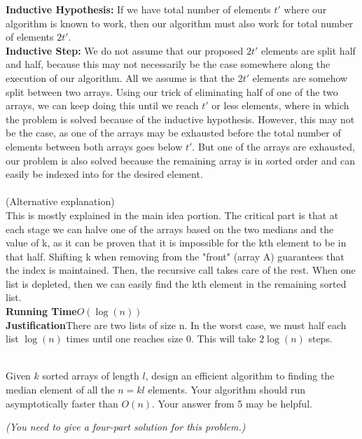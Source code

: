 \begin{qunlist}
{\textbf{Inductive Hypothesis:} If we have total number of elements $t'$ where our algorithm is known to work, then our algorithm must also work for total number of elements $2t'$.
\\
\textbf{Inductive Step:} We do not assume that our proposed $2t'$ elements are split half and half, because this may not necessarily be the case somewhere along the execution of our algorithm. All we assume is that the $2t'$ elements are somehow split between two arrays. Using our trick of eliminating half of one of the two arrays, we can keep doing this until we reach $t'$ or less elements, where in which the problem is solved because of the inductive hypothesis. However, this may not be the case, as one of the arrays may be exhausted before the total number of elements between both arrays goes below $t'$. But one of the arrays are exhausted, our problem is also solved because the remaining array is in sorted order and can easily be indexed into for the desired element. 
 \\ \\
(Alternative explanation)\\
This is mostly explained in the main idea portion. The critical part is that at each stage we can halve one of the arrays based on the two medians and the value of k, as it can be proven that it is impossible for the kth element to be in that half. Shifting k when removing from the "front" (array A) guarantees that the index is maintained. Then, the recursive call takes care of the rest. When one list is depleted, then we can easily find the kth element in the remaining sorted list. \\
\textbf{Running Time}$O(\log(n))$\\
\textbf{Justification}There are two lists of size n. In the worst case, we must half each list $\log(n)$ times until one reaches size 0. This will take $2\log(n)$ steps.
}

 \\
Given $k$ sorted arrays of length $l$, design an efficient algorithm to finding the median element of all the $n=kl$ elements. Your algorithm should run  asymptotically faster than $O(n)$. Your answer from 5 may be helpful.

{\em (You need to give a four-part solution for this problem.)}


\end{qunlist}
